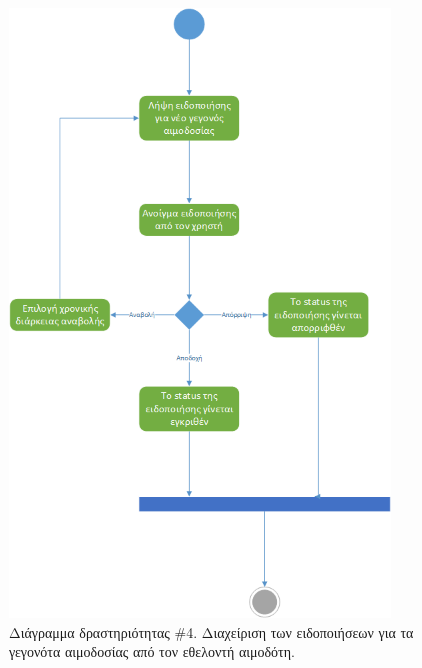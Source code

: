 	    \begin{figure}[H]
		    \centering
		    \includegraphics[width=0.9\textwidth]{ManageNotifications.png}
		    \caption{Διάγραμμα δραστηριότητας \#4. Διαχείριση των ειδοποιήσεων για τα γεγονότα αιμοδοσίας από τον εθελοντή αιμοδότη.}
		    \label{fig:manage}
		\end{figure}

